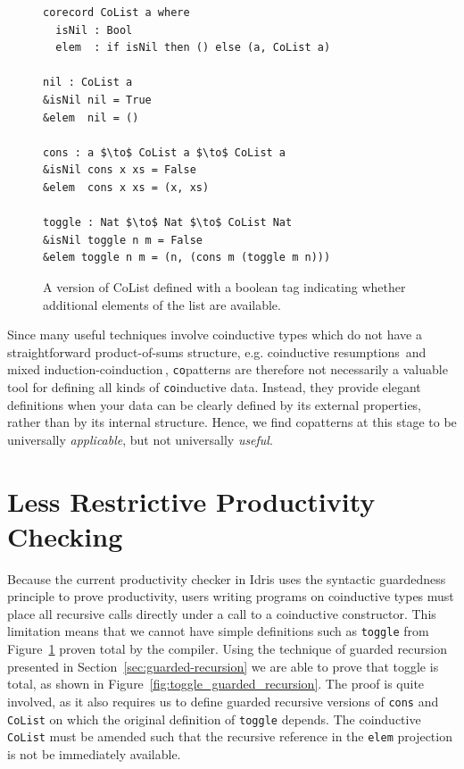 \begin{figure}[h]
\begin{lstlisting}[mathescape]
corecord CoList a where
  isNil : Bool
  elem  : if isNil then () else (a, CoList a)

nil : CoList a
&isNil nil = True
&elem  nil = ()

cons : a $\to$ CoList a $\to$ CoList a
&isNil cons x xs = False
&elem  cons x xs = (x, xs)

toggle : Nat $\to$ Nat $\to$ CoList Nat
&isNil toggle n m = False
&elem toggle n m = (n, (cons m (toggle m n)))
\end{lstlisting}
\caption{A version of CoList defined with a boolean tag indicating whether
  additional elements of the list are available.}
\label{fig:dependent_colist}
\end{figure}

Since many useful techniques involve coinductive types which do not have a
straightforward product-of-sums structure, e.g. coinductive
resumptions\,\citep{Pirog2014273} and mixed
induction-coinduction\,\citep{Danielsson09mixinginduction}, \texttt{co}patterns
are therefore not necessarily a valuable tool for defining all kinds of
\texttt{co}inductive data. Instead, they provide elegant definitions when your data can be
clearly defined by its external properties, rather than by its internal
structure. Hence, we find copatterns at this stage to be universally \emph{applicable}, but not
universally \emph{useful}.


\section{Less Restrictive Productivity Checking} 
\label{sec:less-restr-prod}


Because the current productivity checker in Idris uses the syntactic
guardedness principle to prove productivity, users writing programs on
coinductive types must place all recursive calls directly under a call to a
coinductive constructor. This limitation means that we cannot have simple
definitions such as \texttt{toggle} from Figure~\ref{fig:dependent_colist}
proven total by the compiler. Using the technique of guarded recursion presented
in Section~\ref{sec:guarded-recursion} we are able to prove that toggle is
total, as shown in Figure~\ref{fig:toggle_guarded_recursion}. The proof is quite
involved, as it also requires us to define guarded recursive versions of
\texttt{cons} and \texttt{CoList} on which the original definition of
\texttt{toggle} depends. The coinductive \texttt{CoList} must be amended such
that the recursive reference in the \texttt{elem} projection is not be
immediately available.


